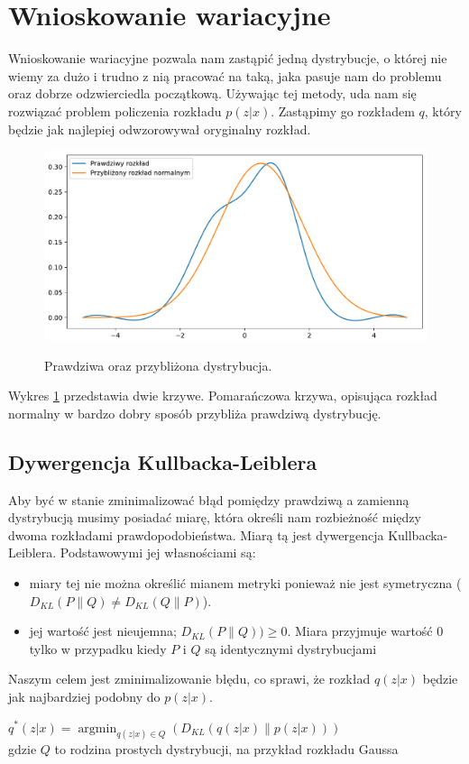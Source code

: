 \documentclass[a4paper,12pt]{book} %
\begin{document}
\section{Wnioskowanie wariacyjne}
Wnioskowanie wariacyjne pozwala nam zastąpić jedną dystrybucje, o której nie wiemy za dużo i trudno z nią pracować na taką, jaka pasuje nam do problemu oraz dobrze odzwierciedla początkową. Używając tej metody, uda nam się rozwiązać problem policzenia rozkładu $p(z|x)$. Zastąpimy go rozkładem $q$, który będzie jak najlepiej odwzorowywał oryginalny rozkład. 
\begin{figure}[h!]
	\centering
	\includegraphics[width=12cm]{approximate.pdf}
	\label{fig:approximate}
	\caption{Prawdziwa oraz przybliżona dystrybucja.}
\end{figure} 

Wykres \ref{fig:approximate} przedstawia dwie krzywe. Pomarańczowa krzywa, opisująca rozkład normalny w bardzo dobry sposób przybliża prawdziwą dystrybucję.
\subsection{Dywergencja Kullbacka-Leiblera}
Aby być w stanie zminimalizować błąd pomiędzy prawdziwą a zamienną dystrybucją musimy posiadać miarę, która określi nam rozbieżność między dwoma rozkładami prawdopodobieństwa. Miarą tą jest dywergencja Kullbacka-Leiblera. Podstawowymi jej własnościami są:
\begin{itemize}
	\item miary tej nie można określić mianem metryki ponieważ nie jest symetryczna ($D_{KL}(P\|Q)\neq D_{KL}(Q\|P)$).
	\item jej wartość jest nieujemna; $D_{KL}(P\|Q)) \geq 0$. Miara przyjmuje wartość 0 tylko w przypadku kiedy $P$ i $Q$ są identycznymi dystrybucjami
\end{itemize}
Naszym celem jest zminimalizowanie błędu, co sprawi, że rozkład $q(z|x)$ będzie jak najbardziej podobny do $p(z|x)$.
\begin{center}
	$q^\ast(z|x)=\operatorname*{argmin}_{q(z|x)\in Q}(D_{KL}(q(z|x)\|p(z|x)))$
	\\gdzie $Q$ to rodzina prostych dystrybucji, na przykład rozkładu Gaussa 
\end{center}
\end{document}
